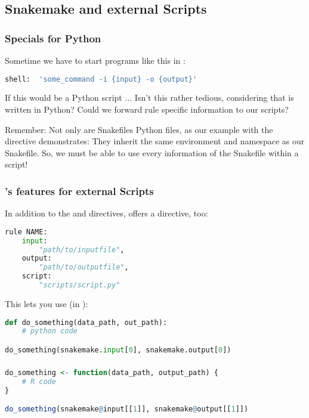 \subsection{Snakemake and external Scripts}

\begin{frame}[fragile]
  \frametitle{\Snakemake{} Specials for Python}
  Sometime we have to start programs like this in \Snakemake:
  \begin{lstlisting}[language=Python,style=Python]
shell:  'some_command -i {input} -o {output}'
  \end{lstlisting}
  \begin{question}
  	If this would be a Python script $\ldots$ Isn't this rather tedious, considering that \Snakemake{} is written in Python? Could we forward rule specific information to our scripts?
  \end{question}
  \pause
  \begin{docs}
  	Remember: Not only are Snakefiles Python files, as our example with the  directive demonstrates: They inherit the same environment and namespace as our Snakefile. So, we must be able to use every information of the Snakefile within a script!
  \end{docs}
\end{frame}

\begingroup
{}
\begin{frame}[fragile]
  \frametitle{\Snakemake's features for external Scripts}
  In addition to the  and  directives, \Snakemake{} offers a  directive, too:
  \begin{lstlisting}[language=Python,style=Python]
rule NAME:
    input:
        "path/to/inputfile",
    output:
        "path/to/outputfile",
    script:
        "scripts/script.py"
  \end{lstlisting}
  This lets you use (in ):
  \begin{lstlisting}[language=Python,style=Python]
def do_something(data_path, out_path):
    # python code

do_something(snakemake.input[0], snakemake.output[0])
  \end{lstlisting}
\end{frame}
\endgroup

\begin{frame}[fragile]
  \frametitle{}
  \begin{lstlisting}[language=R,style=R]
do_something <- function(data_path, output_path) {
    # R code
}

do_something(snakemake@input[[1]], snakemake@output[[1]])
  \end{lstlisting}
\end{frame}

